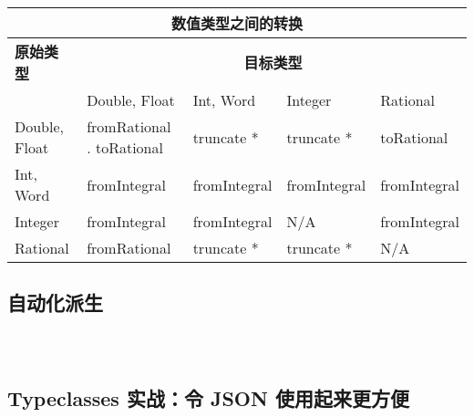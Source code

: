 \documentclass[./main.tex]{subfiles}
\begin{document}
\begin{center}
  \begin{tabular}{|l|l|l|l|l|}
    \hline
    \multicolumn{5}{|c|}{\textbf{数值类型之间的转换}}                                                         \\
    \hline
    \textbf{原始类型} & \multicolumn{4}{|c|}{\textbf{目标类型}}                                              \\
    \hline
                  & Double, Float                       & Int, Word    & Integer      & Rational     \\
    \hline
    Double, Float & fromRational . toRational           & truncate *   & truncate *   & toRational   \\
    Int, Word     & fromIntegral                        & fromIntegral & fromIntegral & fromIntegral \\
    Integer       & fromIntegral                        & fromIntegral & N/A          & fromIntegral \\
    Rational      & fromRational                        & truncate *   & truncate *   & N/A          \\
    \hline
  \end{tabular}
\end{center}

\subsection*{自动化派生}



\begin{lstlisting}[language=Haskell]

\end{lstlisting}



\begin{lstlisting}[language=Haskell]

\end{lstlisting}



\begin{lstlisting}[language=Haskell]

\end{lstlisting}

\subsection*{Typeclasses 实战：令 JSON 使用起来更方便}
\end{document}
